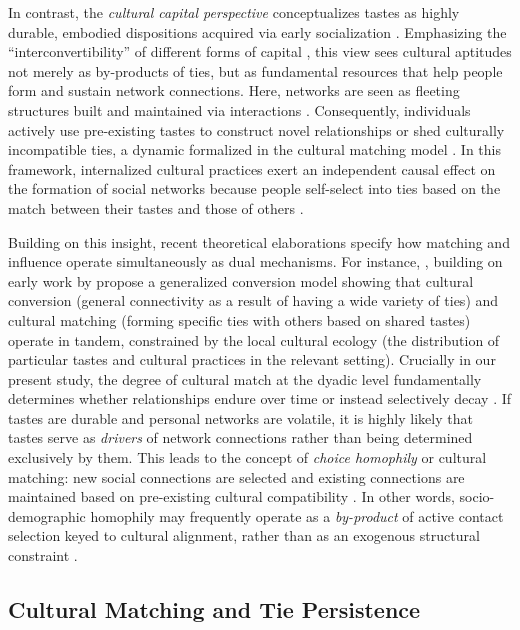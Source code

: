 \documentclass[
  letterpaper,
  DIV=11,
  numbers=noendperiod]{scrartcl}
\begin{document}
In contrast, the \textit{cultural capital perspective} conceptualizes tastes as highly durable, embodied dispositions acquired via early socialization \citep{bourdieu1984, bourdieu1990, holt1998, childress2019encultured-e58}. Emphasizing the ``interconvertibility'' of different forms of capital \citep{bourdieu1986}, this view sees cultural aptitudes not merely as by-products of ties, but as fundamental resources that help people form and sustain network connections. Here, networks are seen as fleeting structures built and maintained via interactions \citep{dimaggio1987}. Consequently, individuals actively use pre-existing tastes to construct novel relationships or shed culturally incompatible ties, a dynamic formalized in the cultural matching model \citep{lizardo2006, vaisey2010}. In this framework, internalized cultural practices exert an independent causal effect on the formation of social networks because people self-select into ties based on the match between their tastes and those of others \citep{shalizi2011}.

Building on this insight, recent theoretical elaborations specify how matching and influence operate simultaneously as dual mechanisms. For instance, \citet{lewis2018}, building on early work by \citet{lizardo2006} propose a generalized conversion model showing that cultural conversion (general connectivity as a result of having a wide variety of ties) and cultural matching (forming specific ties with others based on shared tastes) operate in tandem, constrained by the local cultural ecology (the distribution of particular tastes and cultural practices in the relevant setting). Crucially in our present study, the degree of cultural match at the dyadic level fundamentally determines whether relationships endure over time or instead selectively decay \citep{martin2006}. If tastes are durable and personal networks are volatile, it is highly likely that tastes serve as \emph{drivers} of network connections rather than being determined exclusively by them. This leads to the concept of \textit{choice homophily} or cultural matching: new social connections are selected and existing connections are maintained based on pre-existing cultural compatibility \citep{lazarsfeld1954, werner1979}. In other words, socio-demographic homophily may frequently operate as a \emph{by-product} of active contact selection keyed to cultural alignment, rather than as an exogenous structural constraint \citep{carley1991, dimaggio1987}.

\subsection{Cultural Matching and Tie Persistence}\label{cultural-matching-and-tie-persistence}
\end{document}
